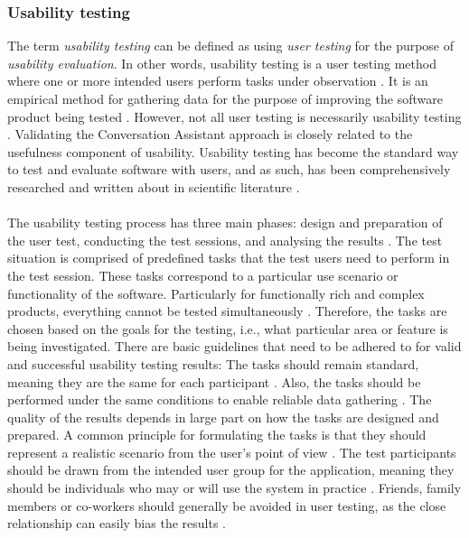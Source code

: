 \documentclass[english, 12pt, a4paper, pdftex, elec, utf8]{aaltothesis}
\begin{document}
\subsubsection{Usability testing} \label{sec:usertesting}

The term \textit{usability testing} can be defined as using \textit{user testing} for the purpose of \textit{usability evaluation}. In other words, usability testing is a user testing method where one or more intended users perform tasks under observation \cite{riihiaho2015}. It is an empirical method for gathering data for the purpose of improving the software product being tested \cite{dumas1999}. However, not all user testing is necessarily usability testing \cite{de2009usability}. Validating the Conversation Assistant approach is closely related to the usefulness component of usability. Usability testing has become the standard way to test and evaluate software with users, and as such, has been comprehensively researched and written about in scientific literature \cite{deuff2013user, rubin2008handbook, riihiaho2015}. \\\\
The usability testing process has three main phases: design and preparation of the user test, conducting the test sessions, and analysing the results \cite{riihiaho2015}. The test situation is comprised of predefined tasks that the test users need to perform in the test session. These tasks correspond to a particular use scenario or functionality of the software. Particularly for functionally rich and complex products, everything cannot be tested simultaneously \cite{dumas1999}. Therefore, the tasks are chosen based on the goals for the testing, i.e., what particular area or feature is being investigated. There are basic guidelines that need to be adhered to for valid and successful usability testing results: The tasks should remain standard, meaning they are the same for each participant \cite{richter2014user}. Also, the tasks should be performed under the same conditions to enable reliable data gathering \cite{riihiaho2015}. The quality of the results depends in large part on how the tasks are designed and prepared. A common principle for formulating the tasks is that they should represent a realistic scenario from the user’s point of view \cite[p.~62]{richter2014user}. The test participants should be drawn from the intended user group for the application, meaning they should be individuals who may or will use the system in practice \cite{riihiaho2015}. Friends, family members or co-workers should generally be avoided in user testing, as the close relationship can easily bias the results \cite[p.~32]{riihiaho2015}. \\\\
\end{document}
